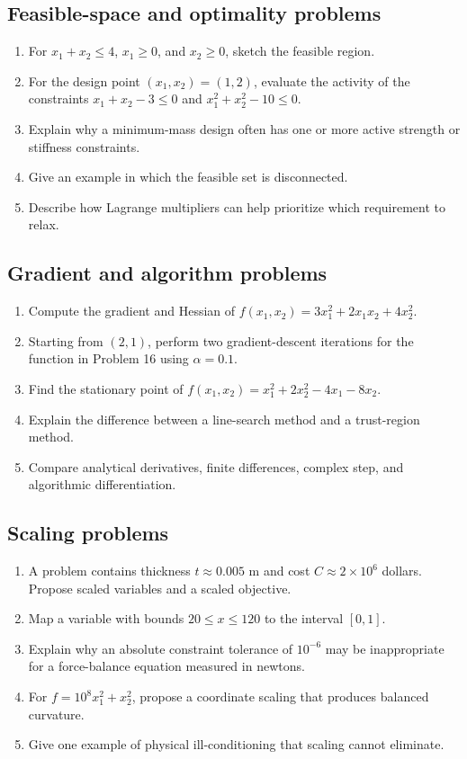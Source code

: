 \documentclass[11pt]{article}
\begin{document}
\subsection*{Feasible-space and optimality problems}
\begin{enumerate}[leftmargin=1.5em,label=\textbf{P\arabic*.},resume]
  \item For $x_1+x_2\leq4$, $x_1\geq0$, and $x_2\geq0$, sketch the feasible region.
  \item For the design point $(x_1,x_2)=(1,2)$, evaluate the activity of the constraints $x_1+x_2-3\leq0$ and $x_1^2+x_2^2-10\leq0$.
  \item Explain why a minimum-mass design often has one or more active strength or stiffness constraints.
  \item Give an example in which the feasible set is disconnected.
  \item Describe how Lagrange multipliers can help prioritize which requirement to relax.
\end{enumerate}

\subsection*{Gradient and algorithm problems}
\begin{enumerate}[leftmargin=1.5em,label=\textbf{P\arabic*.},resume]
  \item Compute the gradient and Hessian of $f(x_1,x_2)=3x_1^2+2x_1x_2+4x_2^2$.
  \item Starting from $(2,1)$, perform two gradient-descent iterations for the function in Problem 16 using $\alpha=0.1$.
  \item Find the stationary point of $f(x_1,x_2)=x_1^2+2x_2^2-4x_1-8x_2$.
  \item Explain the difference between a line-search method and a trust-region method.
  \item Compare analytical derivatives, finite differences, complex step, and algorithmic differentiation.
\end{enumerate}

\subsection*{Scaling problems}
\begin{enumerate}[leftmargin=1.5em,label=\textbf{P\arabic*.},resume]
  \item A problem contains thickness $t\approx0.005$ m and cost $C\approx2\times10^6$ dollars. Propose scaled variables and a scaled objective.
  \item Map a variable with bounds $20\leq x\leq120$ to the interval $[0,1]$.
  \item Explain why an absolute constraint tolerance of $10^{-6}$ may be inappropriate for a force-balance equation measured in newtons.
  \item For $f=10^8x_1^2+x_2^2$, propose a coordinate scaling that produces balanced curvature.
  \item Give one example of physical ill-conditioning that scaling cannot eliminate.
\end{enumerate}
\end{document}
